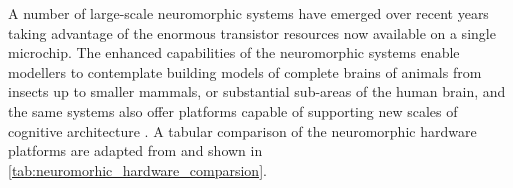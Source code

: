 \begin{table}
	\centering
	\caption{Comparison of the key features of the popular neuromorphic systems and human brain. The details are adapted from \citep{scott2015thesis, furber2016large}.}
	\label{tab:neuromorhic_hardware_comparsion}
\end{table}

A number of large-scale neuromorphic systems have emerged over recent years taking advantage of the enormous transistor resources now available on a single microchip. The enhanced capabilities of the neuromorphic systems enable modellers to contemplate building models of complete brains of animals from insects up to smaller mammals, or substantial sub-areas of the human brain, and the same systems also offer platforms capable of supporting new scales of cognitive architecture \citep{furber2016large}. A tabular comparison of the neuromorphic hardware platforms are adapted from \citep{scott2015thesis} and shown in \tablename \ref{tab:neuromorhic_hardware_comparsion}.

